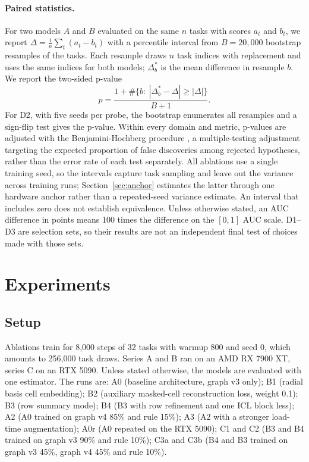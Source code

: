 \documentclass[11pt]{article}
\begin{document}
\paragraph{Paired statistics.} For two models $A$ and $B$ evaluated on the same $n$ tasks with scores
$a_t$ and $b_t$, we report $\Delta=\frac{1}{n}\sum_t(a_t-b_t)$ with a percentile interval from
$B=20{,}000$ bootstrap resamples of the tasks. Each resample draws $n$ task indices with replacement
and uses the same indices for both models; $\Delta_b^*$ is the mean difference in resample $b$.
We report the two-sided p-value
\begin{equation}
p=\frac{1+\#\{b:\ |\Delta^{*}_b-\Delta|\ge|\Delta|\}}{B+1}.
\end{equation}
For D2, with five seeds per probe, the bootstrap enumerates all resamples and a sign-flip test gives
the p-value. Within every domain and metric, p-values are adjusted with the Benjamini-Hochberg
procedure \cite{benjamini1995}, a multiple-testing adjustment targeting the expected proportion of
false discoveries among rejected hypotheses, rather than the error rate of each test separately.
All ablations use a single training seed, so the intervals capture
task sampling and leave out the variance across training runs; Section~\ref{sec:anchor} estimates the
latter through one hardware anchor rather than a repeated-seed variance estimate. An interval that includes
zero does not establish equivalence. Unless otherwise stated,
an AUC difference in points means 100 times the difference on the $[0,1]$ AUC scale. D1--D3 are selection
sets, so their results are not an independent final test of choices made with those sets.

\section{Experiments}
\label{sec:exp}

\subsection{Setup}
Ablations train for 8,000 steps of 32 tasks with warmup 800 and seed 0, which amounts to 256,000 task
draws. Series A and B ran on an AMD RX 7900 XT, series C on an RTX 5090. Unless stated otherwise, the
models are evaluated with one estimator. The runs are:
A0 (baseline architecture, graph v3 only); B1 (radial basis cell embedding);
B2 (auxiliary masked-cell reconstruction loss, weight 0.1); B3 (row summary mode);
B4 (B3 with row refinement and one ICL block less); A2 (A0 trained on graph v4 85\% and rule 15\%);
A3 (A2 with a stronger load-time augmentation); A0r (A0 repeated on the RTX 5090);
C1 and C2 (B3 and B4 trained on graph v3 90\% and rule 10\%); C3a and C3b (B4 and B3 trained on
graph v3 45\%, graph v4 45\% and rule 10\%).
\end{document}

